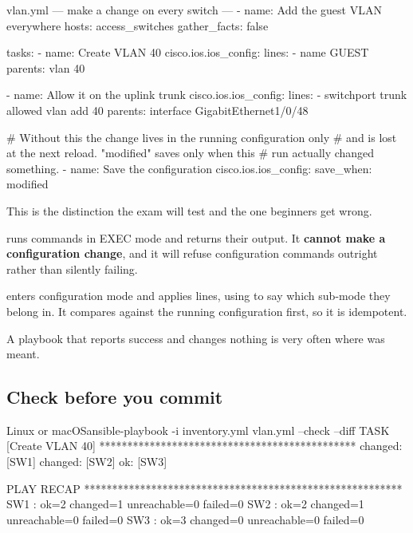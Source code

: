 \begin{playbook}{vlan.yml --- make a change on every switch}
---
- name: Add the guest VLAN everywhere
  hosts: access_switches
  gather_facts: false

  tasks:
    - name: Create VLAN 40
      cisco.ios.ios_config:
        lines:
          - name GUEST
        parents: vlan 40

    - name: Allow it on the uplink trunk
      cisco.ios.ios_config:
        lines:
          - switchport trunk allowed vlan add 40
        parents: interface GigabitEthernet1/0/48

    # Without this the change lives in the running configuration only
    # and is lost at the next reload. "modified" saves only when this
    # run actually changed something.
    - name: Save the configuration
      cisco.ios.ios_config:
        save_when: modified
\end{playbook}

\begin{alertbox}
This is the distinction the exam will test and the one beginners get wrong.

 runs commands in EXEC mode and returns their output. It
\textbf{cannot make a configuration change}, and it will refuse configuration
commands outright rather than silently failing.

 enters configuration mode and applies lines, using
 to say which sub-mode they belong in. It compares against the
running configuration first, so it is idempotent.

A playbook that reports success and changes nothing is very often
 where  was meant.
\end{alertbox}

\subsection{Check before you commit}

\begin{hostcmd}{Linux or macOS}{ansible-playbook -i inventory.yml vlan.yml --check --diff}
TASK [Create VLAN 40] **********************************************
changed: [SW1]
changed: [SW2]
ok: [SW3]

PLAY RECAP *********************************************************
SW1  : ok=2  changed=1  unreachable=0  failed=0
SW2  : ok=2  changed=1  unreachable=0  failed=0
SW3  : ok=3  changed=0  unreachable=0  failed=0
\end{hostcmd}

